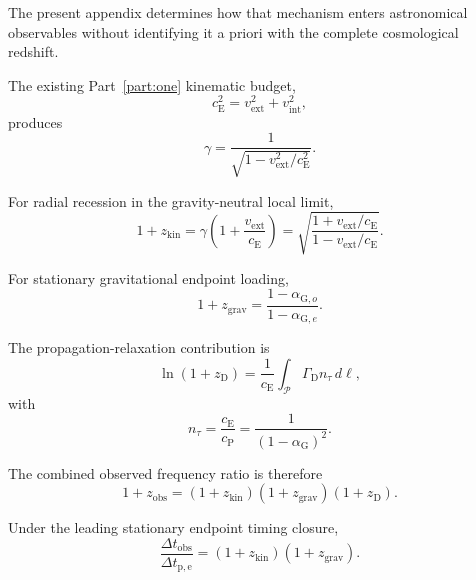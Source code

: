 The present appendix determines how that mechanism enters astronomical
observables without identifying it a priori with the complete cosmological
redshift.

The existing Part~\ref{part:one} kinematic budget,
\begin{equation}
    c_{\mathrm E}^{2}
    =
    v_{\mathrm{ext}}^{2}
    +
    v_{\mathrm{int}}^{2},
\end{equation}
produces
\begin{equation}
    \gamma
    =
    \frac{1}{
        \sqrt{
            1-v_{\mathrm{ext}}^{2}/c_{\mathrm E}^{2}
        }
    }.
\end{equation}

For radial recession in the gravity-neutral local limit,
\begin{equation}
    1+z_{\mathrm{kin}}
    =
    \gamma
    \left(
        1+
        \frac{
            v_{\mathrm{ext}}
        }{
            c_{\mathrm E}
        }
    \right)
    =
    \sqrt{
        \frac{
            1+v_{\mathrm{ext}}/c_{\mathrm E}
        }{
            1-v_{\mathrm{ext}}/c_{\mathrm E}
        }
    }.
\end{equation}

For stationary gravitational endpoint loading,
\begin{equation}
    1+z_{\mathrm{grav}}
    =
    \frac{
        1-\alpha_{\mathrm G,o}
    }{
        1-\alpha_{\mathrm G,e}
    }.
\end{equation}

The propagation-relaxation contribution is
\begin{equation}
    \ln(1+z_{\mathrm D})
    =
    \frac{1}{
        c_{\mathrm E}
    }
    \int_{\mathcal P}
    \Gamma_{\mathrm D}
    n_\tau\,d\ell,
\end{equation}
with
\begin{equation}
    n_\tau
    =
    \frac{
        c_{\mathrm E}
    }{
        c_{\mathrm P}
    }
    =
    \frac{1}{
        (1-\alpha_{\mathrm G})^2
    }.
\end{equation}

The combined observed frequency ratio is therefore
\begin{equation}
    \boxed{
    1+z_{\mathrm{obs}}
    =
    (1+z_{\mathrm{kin}})
    (1+z_{\mathrm{grav}})
    (1+z_{\mathrm D}).
    }
\end{equation}

Under the leading stationary endpoint timing closure,
\begin{equation}
    \frac{
        \Delta t_{\mathrm{obs}}
    }{
        \Delta t_{\mathrm{p,e}}
    }
    =
    (1+z_{\mathrm{kin}})
    (1+z_{\mathrm{grav}}).
\end{equation}


